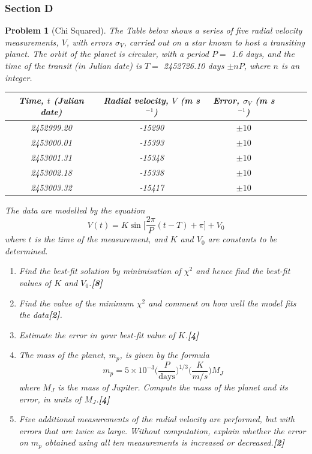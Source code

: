 \documentclass[a4paper]{article}
\theoremstyle{new}
\newtheorem{qns}{Problem}[subsection]
\begin{document}
\subsubsection{Section D}
\begin{qns}[Chi Squared]
The Table below shows a series of five radial velocity measurements, $V$, with errors $\sigma_V$, carried out on a star known to host a transiting  planet. The orbit of the planet is circular, with a period $P =$ 1.6 days, and the time of the transit (in Julian date) is $T =$ 2452726.10 days $\pm nP$, where $n$ is an integer.
\begin{center}
\begin{tabular}{ c c c c c c}
Time, $t$ (Julian date) & Radial velocity, $V$ (m s$^{-1}$) & Error, $\sigma_V$ (m s$^{-1}$)\\
\hline
2452999.20 & -15290 & $\pm10$\\
2453000.01 & -15393 & $\pm10$\\
2453001.31 & -15348 & $\pm10$\\
2453002.18 & -15338 & $\pm10$\\
2453003.32 & -15417 & $\pm10$
\end{tabular}
\end{center}
The data are modelled by the equation
$$V(t)=K\sin\bigg[\frac{2\pi}{P}(t-T)+\pi\bigg]+V_0$$
where $t$ is the time of the measurement, and $K$ and $V_0$ are constants to be determined.
\begin{enumerate}[label=(\roman*)]
\item Find the best-fit solution by minimisation of $\chi^2$ and hence find the best-fit values of $K$ and $V_0$.\hfill\textbf{[8]}
\item Find the value of the minimum $\chi^2$ and comment on how well the model fits the data\hfill\textbf{[2]}.
\item Estimate the error in your best-fit value of $K$.\hfill\textbf{[4]}
\item The mass of the planet, $m_p$, is given by the formula 
$$m_p=5\times10^{-3}\bigg(\frac{P}{\text{days}}\bigg)^{1/3}\bigg(\frac{K}{m/s}\bigg)M_J$$
where $M_J$ is the mass of Jupiter. Compute the mass of the planet and its error, in units of $M_J$.\hfill\textbf{[4]}
\item Five additional measurements of the radial velocity are performed, but with errors that are twice as large. Without computation, explain whether the error on $m_p$ obtained using all ten measurements is increased or decreased.\hfill\textbf{[2]}
\end{enumerate}
\end{qns}
\end{document}
